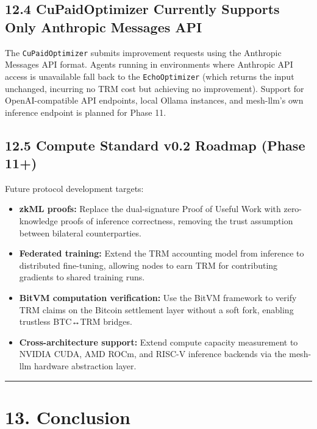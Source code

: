\documentclass[
  11pt,
]{article}
\providecommand{\tightlist}{%
  \setlength{\itemsep}{0pt}\setlength{\parskip}{0pt}}
\begin{document}
\subsection{12.4 CuPaidOptimizer Currently Supports Only Anthropic
Messages
API}\label{cupaidoptimizer-currently-supports-only-anthropic-messages-api}

The \texttt{CuPaidOptimizer} submits improvement requests using the
Anthropic Messages API format. Agents running in environments where
Anthropic API access is unavailable fall back to the
\texttt{EchoOptimizer} (which returns the input unchanged, incurring no
TRM cost but achieving no improvement). Support for OpenAI-compatible
API endpoints, local Ollama instances, and mesh-llm's own inference
endpoint is planned for Phase 11.

\subsection{12.5 Compute Standard v0.2 Roadmap (Phase
11+)}\label{compute-standard-v0.2-roadmap-phase-11}

Future protocol development targets:

\begin{itemize}
\tightlist
\item
  \textbf{zkML proofs:} Replace the dual-signature Proof of Useful Work
  with zero-knowledge proofs of inference correctness, removing the
  trust assumption between bilateral counterparties.
\item
  \textbf{Federated training:} Extend the TRM accounting model from
  inference to distributed fine-tuning, allowing nodes to earn TRM for
  contributing gradients to shared training runs.
\item
  \textbf{BitVM computation verification:} Use the BitVM framework to
  verify TRM claims on the Bitcoin settlement layer without a soft fork,
  enabling trustless BTC↔TRM bridges.
\item
  \textbf{Cross-architecture support:} Extend compute capacity
  measurement to NVIDIA CUDA, AMD ROCm, and RISC-V inference backends
  via the mesh-llm hardware abstraction layer.
\end{itemize}

\begin{center}\rule{0.5\linewidth}{0.5pt}\end{center}

\section{13. Conclusion}\label{conclusion}
\end{document}
